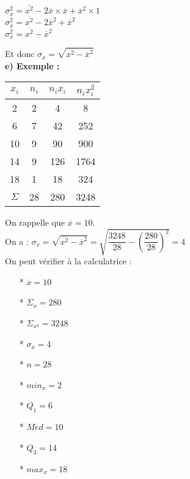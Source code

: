 $ \sigma_x^2 = \overline{x^2} - 2\overline{x} \times \overline{x} + \overline{x}^2 \times 1 $ \\

$ \sigma_x^2 = \overline{x^2} - 2\overline{x}^2 + \overline{x}^2 $ \\

$ \sigma_x^2 = \overline{x^2} - \overline{x}^2 $

Et donc $ \sigma_x = \sqrt{\overline{x^2} - \overline{x}^2} $ \\

\textbf{e) Exemple :} \\

\begin{tabular}{c|c|c|c}
$x_i$ & $n_i$ & $n_ix_i$ & $n_ix_i^2$ \\
\hline
2 & 2 & 4 & 8 	\\
6 & 7 & 42 & 252 \\
10 & 9 & 90 & 900 \\
14 & 9 & 126 & 1764 \\
18 & 1 & 18 & 324 \\
\hline
$\Sigma$ & 28 & 280 & 3248 \\
\end{tabular}

\vspace{.3cm
}
On rappelle que $\overline{x} = 10 $. \\

On a : $ \sigma_x = \sqrt{\overline{x^2} - \overline{x}^2} = \sqrt{\dfrac{3248}{28} - \left(\dfrac{280}{28}\right)^2} = 4 $ \\


On peut vérifier à la calculatrice : 

\begin{itemize}
\item[*] $\overline{x} = 10$ 
\item[*] $\Sigma_x = 280$ 
\item[*] $\Sigma_{x^2} = 3248$ 
\item[*] $\sigma_x = 4$ 
\item[*] $n = 28$ 
\item[*] $min_x = 2$ 
\item[*] $Q_1 = 6$ 
\item[*] $Med = 10$ 
\item[*] $Q_3 = 14$ 
\item[*] $max_x = 18$ \\
\end{itemize}

